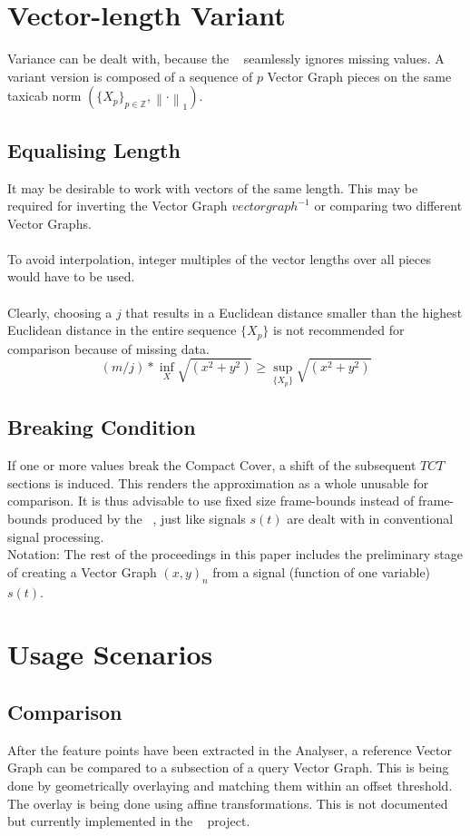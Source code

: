 \documentclass{report}
\newcommand\norm[1]{\left\lVert#1\right\rVert}
\begin{document}
\chapter{Vector-length Variant}
Variance can be dealt with, because the ~\cite[Stopeight\_Analyzer.tex]{Analyzer} seamlessly ignores missing values. A variant version is composed of a sequence of $p$ Vector Graph pieces on the same taxicab norm $(\{X_{p}\}_{p\in \mathbb{Z}},\norm{\cdot}_1)$.
\section{Equalising Length}
It may be desirable to work with vectors of the same length. This may be required for inverting the Vector Graph $vectorgraph^{-1}$ or comparing two different Vector Graphs.\\\\
To avoid interpolation, integer multiples of the vector lengths over all pieces would have to be used.\\\\
Clearly, choosing a $j$ that results in a Euclidean distance smaller than the highest Euclidean distance in the entire sequence $\{X_{p}\}$ is not recommended for comparison because of missing data.
\begin{equation}
(m/j)*\inf \limits _{X} \sqrt{(x^2+y^2)} \geq \sup \limits _{\{X_{p}\}} \sqrt{(x^2+y^2)}\label{eq:4}
\end{equation}
\section{Breaking Condition}
If one or more values break the Compact Cover, a shift of the subsequent $TCT$ sections is induced. This renders the approximation as a whole unusable for comparison. It is thus advisable to use fixed size frame-bounds instead of frame-bounds produced by the ~\cite[Stopeight\_Analyzer.tex]{Analyzer}, just like signals $s(t)$ are dealt with in conventional signal processing.\\
Notation: The rest of the proceedings in this paper includes the preliminary stage of creating a Vector Graph $(x,y)_{n}$ from a signal (function of one variable) $s(t)$. 

\chapter{Usage Scenarios}
\section*{Comparison}
After the feature points have been extracted in the Analyser, a reference Vector Graph can be compared to a subsection of a query Vector Graph. This is being done by geometrically overlaying and matching them within an offset threshold. The overlay is being done using affine transformations. This is not documented but currently implemented in the ~\cite[Stopeight\_Comparator.tex]{Comparator} project.
\end{document}
